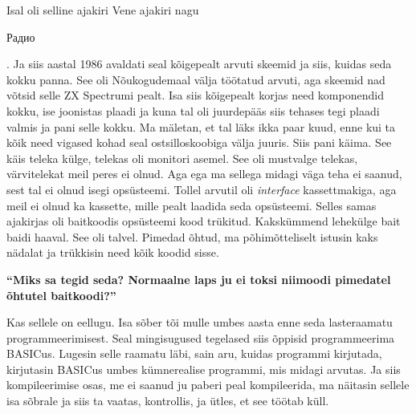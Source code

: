 Isal  oli selline ajakiri Vene ajakiri nagu 
\begin{russian}Радио\end{russian}. Ja siis aastal 1986 avaldati seal 
kõigepealt arvuti skeemid ja siis, kuidas seda kokku panna. See oli 
Nõukogudemaal välja töötatud arvuti, aga skeemid nad võtsid selle ZX Spectrumi 
pealt. Isa siis kõigepealt korjas need komponendid kokku, ise 
joonistas plaadi ja kuna tal oli juurdepääs siis tehases tegi plaadi valmis ja 
pani selle kokku. Ma mäletan, et tal läks ikka paar kuud, enne kui ta kõik need 
vigased kohad seal ostsilloskoobiga välja juuris. Siis pani käima. See käis 
teleka  külge,  telekas oli monitori asemel. See oli mustvalge telekas, 
värvitelekat  meil peres ei olnud.  Aga ega ma sellega  midagi väga teha ei 
saanud, sest tal ei olnud isegi opsüsteemi. Tollel arvutil oli \emph{interface} 
kassettmakiga, aga meil ei olnud ka kassette, mille pealt laadida seda 
opsüsteemi. Selles samas ajakirjas oli baitkoodis opsüsteemi kood trükitud. 
Kakskümmend lehekülge bait baidi haaval. See oli talvel. Pimedad õhtud, ma 
põhimõtteliselt istusin kaks nädalat ja trükkisin need kõik koodid sisse.

\textbf{\enquote{Miks sa tegid seda? Normaalne laps ju ei toksi niimoodi 
pimedatel õhtutel baitkoodi?}}

Kas sellele on eellugu. Isa sõber tõi mulle umbes aasta enne seda lasteraamatu  
programmeerimisest. Seal  mingisugused  tegelased siis õppisid programmeerima 
BASICus. Lugesin selle raamatu läbi, sain aru, kuidas 
programmi kirjutada, kirjutasin BASICus umbes kümnerealise programmi, mis 
midagi arvutas. Ja siis kompileerimise osas, me ei saanud ju paberi peal
kompileerida, ma näitasin sellele isa sõbrale ja siis ta vaatas, kontrollis,  
ja ütles, et see töötab küll.

